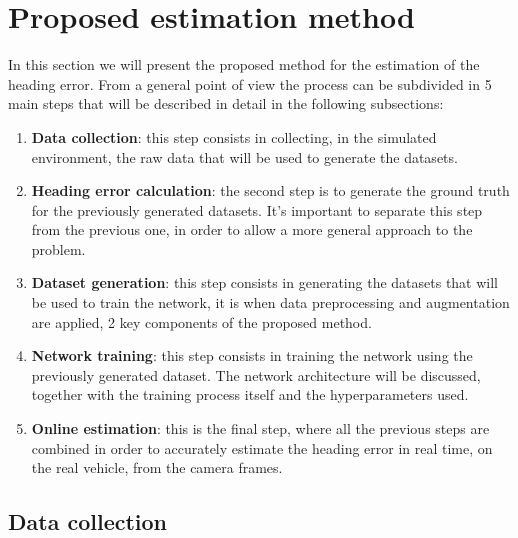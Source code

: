\documentclass[a4paper,12pt,sort&compress]{article}
\begin{document}


\newpage

\section{Proposed estimation method}
In this section we will present the proposed method for the estimation of the heading error. From a
general point of view the process can be subdivided in 5 main steps that will be described in detail
in the following subsections:
\begin{enumerate}
    \item \textbf{Data collection}: this step consists in collecting, in the simulated environment,
    the raw data that will be used to generate the datasets.
    \item \textbf{Heading error calculation}: the second step is to generate the ground truth for the
    previously generated datasets. It's important to separate this step from the previous one, in
    order to allow a more general approach to the problem.
    \item \textbf{Dataset generation}: this step consists in generating the datasets that will be used to
    train the network, it is when data preprocessing and augmentation are applied, 2 key components
    of the proposed method.
    \item \textbf{Network training}: this step consists in training the network using the previously
    generated dataset. The network architecture will be discussed, together with the training
    process itself and the hyperparameters used. 
    \item \textbf{Online estimation}: this is the final step, where all the previous steps are combined in
    order to accurately estimate the heading error in real time, on the real vehicle, from the
    camera frames.
\end{enumerate}

\subsection{Data collection} \label{sec:data_collection}
\end{document}
